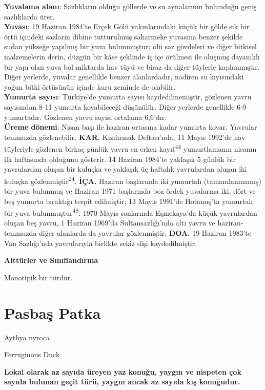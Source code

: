 \documentclass[
  letterpaper,
  DIV=11,
  numbers=noendperiod]{scrreprt}
\begin{document}
\textbf{Yuvalama alanı}: Sazlıkların olduğu göllerde ve su aynalarının
bulunduğu geniş sazlıklarda ürer.\\
\textbf{Yuvası}: 19 Haziran 1984'te Erçek Gölü yakınlarındaki küçük bir
gölde sık bir örtü içindeki sazların dibine tutturulmuş sakarmeke
yuvasına benzer şekilde sudan yükseğe yapılmış bir yuva bulunmuştur; ölü
saz gövdeleri ve diğer bitkisel malzemelerin derin, düzgün bir kâse
şeklinde iç içe örülmesi ile oluşmuş dayanıklı bir yapı olan yuva bol
miktarda hav tüyü ve biraz da diğer tüylerle kaplanmıştır. Diğer
yerlerde, yuvalar genellikle benzer alanlardadır, nadiren su kıyısındaki
yoğun bitki örtüsünün içinde kuru zeminde de olabilir.\\
\textbf{Yumurta sayısı}: Türkiye'de yumurta sayısı kaydedilmemiştir,
gözlenen yavru sayısından 8-11 yumurta koyabileceği düşünülür. Diğer
yerlerde genellikle 6-9 yumurtadır. Gözlenen yavru sayısı ortalama
6,6'dır.\\
\textbf{Üreme dönemi}: Nisan başı ile haziran ortasına kadar yumurta
koyar. Yavrular temmuzda gözlenebilir. \textbf{KAR.} Kızılırmak
Deltası'nda, 11 Mayıs 1992'de hav tüyleriyle gözlenen birkaç günlük
yavru en erken kayıt\textsuperscript{44} yumurtlamanın nisanın ilk
haftasında olduğunu gösterir. 14 Haziran 1984'te yaklaşık 5 günlük bir
yavrulardan oluşan bir kuluçka ve yaklaşık üç haftalık yavrulardan
oluşan iki kuluçka gözlenmiştir\textsuperscript{24}. \textbf{İÇA.}
Haziran başlarında iki yumurtalı (tamamlanmamış) bir yuva bulunmuş ve
Haziran 1971 başlarında boz ördek yuvalarına iki, dört ve beş yumurta
bıraktığı tespit edilmiştir; 13 Mayıs 1991'de Hotamış'ta yumurtalı bir
yuva bulunmuştur\textsuperscript{48}. 1970 Mayıs sonlarında Eşmekaya'da
küçük yavrulardan oluşan beş yavru, 1 Haziran 1969'da Sultansazlığı'nda
altı yavru ve haziran-temmuzda diğer alanlarda da yavrular gözlenmiştir.
\textbf{DOA.} 19 Haziran 1983'te Van Sazlığı'nda yavrularıyla birlikte
sekiz dişi kaydedilmiştir.

\textbf{Alttürler ve Sınıflandırma}

Monotipik bir türdür.

\hypertarget{pasbaux15f-patka}{%
\section{Pasbaş Patka}\label{pasbaux15f-patka}}

Aythya nyroca

Ferruginous Duck

\textbf{Lokal olarak az sayıda üreyen yaz konuğu, yaygın ve nispeten çok
sayıda bulunan geçit türü, yaygın ancak az sayıda kış konuğudur.}
\end{document}
